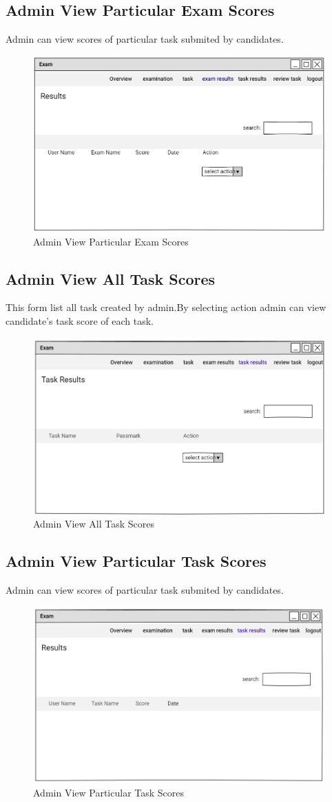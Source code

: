 \documentclass[a4paper,12pt]{report}
\begin{document}
\subsection { Admin View Particular Exam Scores}
Admin can view scores of particular task submited by candidates. 
\begin{figure}[bph]
	\centering
	\includegraphics[width=.6\linewidth]{img/admin/adminviewrsltofparticlrxam}
	\caption{Admin View Particular Exam Scores}
\end{figure}
\pagebreak

\subsection { Admin View All Task Scores}
This form list all task created by admin.By selecting action admin can view candidate's  task score of each task. 
\begin{figure}[bph]
	\centering
	\includegraphics[width=.6\linewidth]{img/admin/adviewalltskrslt}
	\caption{Admin View All Task Scores}
\end{figure}
\subsection { Admin View Particular Task Scores}
Admin can view scores of particular task submited by candidates. 
\begin{figure}[bph]
	\centering
	\includegraphics[width=.6\linewidth]{img/admin/adview_singletskrslt}
	\caption{Admin View Particular Task Scores}
\end{figure}
\pagebreak
\end{document}
